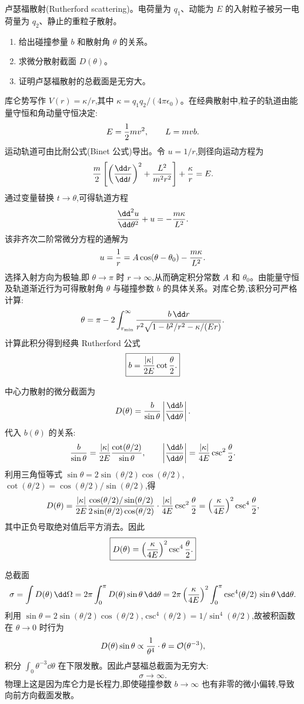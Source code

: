 \begin{question}
卢瑟福散射(Rutherford scattering)。电荷量为 $q_1$、动能为 $E$ 的入射粒子被另一电荷量为 $q_2$、静止的重粒子散射。
\begin{enumerate}
\item 给出碰撞参量 $b$ 和散射角 $\theta$ 的关系。
\item 求微分散射截面 $D(\theta)$。
\item 证明卢瑟福散射的总截面是无穷大。
\end{enumerate}
\begin{solution}
库仑势写作 $V(r)=\kappa/r$,其中 $\kappa=q_1q_2/(4\pi\epsilon_0)$。在经典散射中,粒子的轨道由能量守恒和角动量守恒决定:
\[
E={1\over2}mv^2,\qquad L=mvb.
\]
运动轨道可由比耐公式(Binet 公式)导出。令 $u=1/r$,则径向运动方程为
\[
{m\over2}\left[\left({\dd r\over\dd t}\right)^2+{L^2\over m^2r^2}\right]+{\kappa\over r}=E.
\]
通过变量替换 $t\to\theta$,可得轨道方程
\[
{\dd^2 u\over\dd\theta^2}+u=-{m\kappa\over L^2}.
\]
该非齐次二阶常微分方程的通解为
\[
u={1\over r}=A\cos(\theta-\theta_0)-{m\kappa\over L^2}.
\]
选择入射方向为极轴,即 $\theta\to\pi$ 时 $r\to\infty$,从而确定积分常数 $A$ 和 $\theta_0$。由能量守恒及轨道渐近行为可得散射角 $\theta$ 与碰撞参数 $b$ 的具体关系。对库仑势,该积分可严格计算:
\[
\theta=\pi-2\int_{r_{\min}}^{\infty}{b\,\dd r\over r^2\sqrt{1-b^2/r^2-\kappa/(Er)}}.
\]
计算此积分得到经典 Rutherford 公式
\[
\boxed{b={|\kappa|\over2E}\cot{\theta\over2}.}
\]

中心力散射的微分截面为
\[
D(\theta)={b\over\sin\theta}\left|{\dd b\over\dd\theta}\right|.
\]
代入 $b(\theta)$ 的关系:
\[
{b\over\sin\theta}={|\kappa|\over2E}{\cot(\theta/2)\over\sin\theta},
\qquad
\left|{\dd b\over\dd\theta}\right|={|\kappa|\over4E}\csc^2{\theta\over2}.
\]
利用三角恒等式 $\sin\theta=2\sin(\theta/2)\cos(\theta/2)$,$\cot(\theta/2)=\cos(\theta/2)/\sin(\theta/2)$,得
\[
D(\theta)={|\kappa|\over2E}{\cos(\theta/2)/\sin(\theta/2)\over2\sin(\theta/2)\cos(\theta/2)}\cdot{|\kappa|\over4E}\csc^2{\theta\over2}
=\left({\kappa\over4E}\right)^2\csc^4{\theta\over2},
\]
其中正负号取绝对值后平方消去。因此
\[
\boxed{D(\theta)=\left({\kappa\over4E}\right)^2\csc^4{\theta\over2}.}
\]

总截面
\[
\sigma=\int D(\theta)\,\dd\Omega=2\pi\int_0^\pi D(\theta)\sin\theta\,\dd\theta
=2\pi\left({\kappa\over4E}\right)^2\int_0^\pi{\csc^4(\theta/2)\,\sin\theta}\,\dd\theta.
\]
利用 $\sin\theta=2\sin(\theta/2)\cos(\theta/2)$,$\csc^4(\theta/2)=1/\sin^4(\theta/2)$,故被积函数在 $\theta\to0$ 时行为
\[
D(\theta)\sin\theta\propto{1\over\theta^4}\cdot\theta={\cal O}(\theta^{-3}),
\]
积分 $\int_0\theta^{-3}\dd\theta$ 在下限发散。因此卢瑟福总截面为无穷大:
\[
\boxed{\sigma\to\infty.}
\]
物理上这是因为库仑力是长程力,即使碰撞参数 $b\to\infty$ 也有非零的微小偏转,导致向前方向截面发散。
\end{solution}
\end{question}

